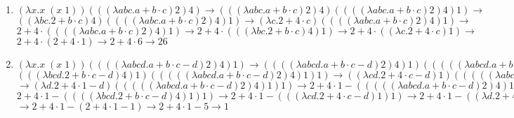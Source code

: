 \documentclass[a4paper]{article}
\begin{document}
\begin{enumerate}
\begin{enumerate}
\item $(\lambda x.x \; (x \; 1))(((\lambda abc.a+b \cdot c)2)4) \rightarrow
(((\lambda abc.a+b \cdot c)2)4)((((\lambda abc.a+b \cdot c)2)4)1) \rightarrow
$ \vspace*{3mm} \\
$((\lambda bc.2+b \cdot c)4)((((\lambda abc.a+b \cdot c)2)4)1) \rightarrow
(\lambda c.2+4 \cdot c)((((\lambda abc.a+b \cdot c)2)4)1) \rightarrow$ 
\vspace*{3mm} \\
$ 2 + 4 \cdot ((((\lambda abc.a+b \cdot c)2)4)1) \rightarrow
2 + 4 \cdot (((\lambda bc.2+b \cdot c)4)1) \rightarrow
2 + 4 \cdot ((\lambda c.2+4 \cdot c)1) \rightarrow$ \vspace*{3mm} \\
$ 2 + 4 \cdot (2+4 \cdot 1) \rightarrow 2 + 4 \cdot 6 \rightarrow 26$
\vspace*{4mm}\\
	
\item $(\lambda x.x \; (x \; 1))((((\lambda abcd.a+b \cdot c-d)2)4)1) \rightarrow
((((\lambda abcd.a+b \cdot c-d)2)4)1)(((((\lambda abcd.a+b \cdot c-d)2)4)1)1) 
\rightarrow$ \vspace*{3mm} \\
$ (((\lambda bcd.2+b \cdot c-d)4)1)(((((\lambda abcd.a+b \cdot c-d)2)4)1)1) 
\rightarrow
((\lambda cd.2+4 \cdot c-d)1)(((((\lambda abcd.a+b \cdot c-d)2)4)1)1)$
\vspace*{3mm} \\
$ \rightarrow (\lambda d.2+4 \cdot 1-d)(((((\lambda abcd.a+b \cdot c-d)2)4)1)1) 
\rightarrow
2 + 4 \cdot 1 - (((((\lambda abcd.a+b \cdot c-d)2)4)1)1) \rightarrow$
\vspace*{3mm} \\
$ 2 + 4 \cdot 1 - ((((\lambda bcd.2+b \cdot c-d)4)1)1) \rightarrow
2 + 4 \cdot 1 - (((\lambda cd.2+4 \cdot c-d)1)1) \rightarrow
2 + 4 \cdot 1 - ((\lambda d.2+4 \cdot 1-d)1)$ \vspace*{3mm} \\
$ \rightarrow 2 + 4 \cdot 1 - (2+4 \cdot 1-1) \rightarrow
2 + 4 \cdot 1 - 5 \rightarrow 1$

\end{enumerate}

\end{enumerate}
\end{document}
